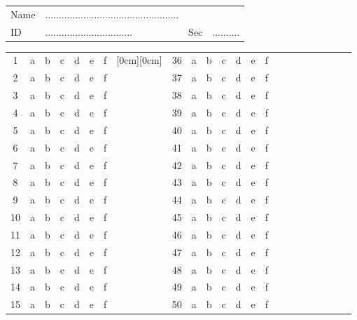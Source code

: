 \documentclass[amsfonts,bezier,leqno,fleqn,12pt,a4paper]{article}
\begin{document}
{{{{\begin{Large}
\begin{tabular}{llll}
Name & .................................................& & \\
ID &   ................................& Sec & ..........\\
\end{tabular}

\vspace{10mm}


\end{Large}
\begin{normalsize}
\begin{center}
\begin{tabular}{|c|c c c c c c|c|c|c c c c c c|c|c|c c c c c c|}
\cline{1-7}\cline{9-15}
1  & a & b & c & d & e & f & \raisebox{0ex}[0cm][0cm]{\hspace{1cm}} & 36 & a & b & c & d & e & f\\ \cline{1-7}\cline{9-15}
2 & a & b & c & d & e & f & & 37& a & b & c & d & e & f\\ \cline{1-7}\cline{9-15}
3 & a & b & c & d & e & f & & 38& a & b & c & d & e & f\\ \cline{1-7}\cline{9-15}
4 & a & b & c & d & e & f & & 39& a & b & c & d & e & f\\ \cline{1-7}\cline{9-15}
5 & a & b & c & d & e & f & & 40& a & b & c & d & e & f\\ \cline{1-7}\cline{9-15}
6 & a & b & c & d & e & f & & 41& a & b & c & d & e & f\\ \cline{1-7}\cline{9-15}
7 & a & b & c & d & e & f & & 42& a & b & c & d & e & f\\ \cline{1-7}\cline{9-15}
8 & a & b & c & d & e & f & & 43& a & b & c & d & e & f\\ \cline{1-7}\cline{9-15}
9 & a & b & c & d & e & f & & 44& a & b & c & d & e & f\\ \cline{1-7}\cline{9-15}
10 & a & b & c & d & e & f & & 45& a & b & c & d & e & f\\ \cline{1-7}\cline{9-15}
11 & a & b & c & d & e & f & & 46& a & b & c & d & e & f\\ \cline{1-7}\cline{9-15}
12 & a & b & c & d & e & f & & 47& a & b & c & d & e & f\\ \cline{1-7}\cline{9-15}
13 & a & b & c & d & e & f & & 48& a & b & c & d & e & f\\ \cline{1-7}\cline{9-15}
14 & a & b & c & d & e & f & & 49& a & b & c & d & e & f\\ \cline{1-7}\cline{9-15}
15 & a & b & c & d & e & f & & 50& a & b & c & d & e & f\\ \cline{1-7}\cline{9-15}

\end{tabular}
\end{center}
\end{normalsize}}}}}
\end{document}
